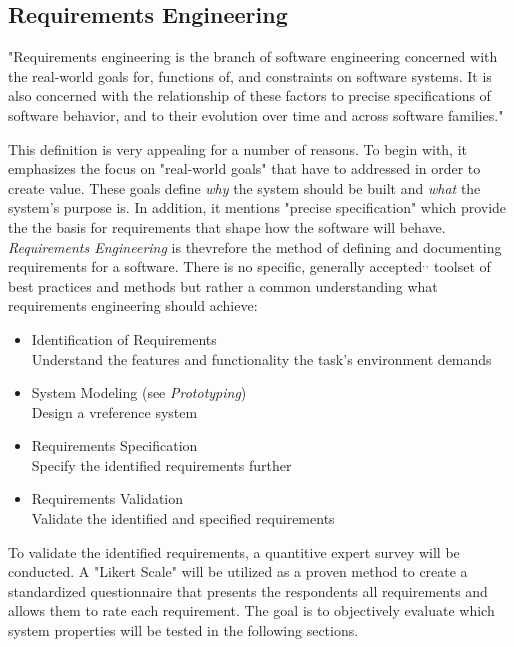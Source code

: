     \subsection{Requirements Engineering}\label{sssec:reqEng}
    "Requirements engineering is the branch of software
    engineering concerned with the real-world goals for,
    functions of, and constraints on software systems. It
    is also concerned with the relationship of these
    factors to precise specifications of software behavior,
    and to their evolution over time and across software
    families."\autocite{Zave1997ClassificationEngineering}
    
    This definition is very appealing for a number of reasons. To begin with, it emphasizes the focus on "real-world goals" that have to addressed in order to create value. These goals define \textit{why} the system should be built and \textit{what} the system's purpose is. In addition, it mentions "precise specification" which provide the the basis for requirements that shape how the software will behave. \textit{Requirements Engineering} is thevrefore the method of defining and documenting requirements for a software. There is no specific, generally accepted\autocite{Budde1992Prototyping}$^{,}$\autocite{Sommerville1999RequirementsGuide}$^{,}$\autocite{Sommerville2010SoftwareEngineering} toolset of best practices and methods but rather a common understanding what requirements engineering should achieve: 
    \begin{itemize}
        \item Identification of Requirements\\
            Understand the features and functionality the task's environment demands
        \item System Modeling (see \textit{Prototyping})\\
            Design a vreference system 
        \item Requirements Specification\\
            Specify the identified requirements further
        \item Requirements Validation\\
            Validate the identified and specified requirements
    \end{itemize}
    
    To validate the identified requirements, a quantitive expert survey will be conducted. A "Likert Scale" \autocite{Likert1932AAttitudes} will be utilized as a proven method to create a standardized questionnaire that presents the respondents all requirements and allows them to rate each requirement. The goal is to objectively evaluate which system properties will be tested in the following sections.
    
